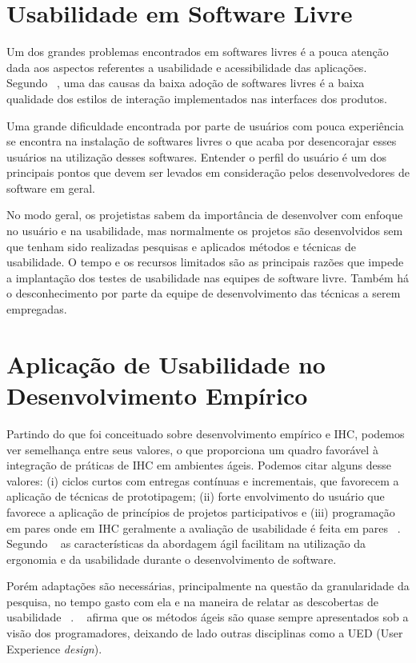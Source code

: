 \newpage

\section{Usabilidade em Software Livre}

Um dos grandes problemas encontrados em softwares livres é a pouca atenção dada aos aspectos referentes a usabilidade e acessibilidade das aplicações. 
%
Segundo ~, uma das causas da baixa adoção de softwares livres é a baixa qualidade dos estilos de interação implementados nas interfaces dos produtos. 

Uma grande dificuldade encontrada por parte de usuários com pouca experiência se encontra na instalação de softwares livres o que acaba por desencorajar esses usuários na utilização desses softwares. Entender o perfil do usuário é um dos principais pontos que devem ser levados em consideração pelos desenvolvedores de software em geral. 

No modo geral, os projetistas sabem da importância de desenvolver com enfoque no usuário e na usabilidade, mas normalmente os projetos são desenvolvidos sem que tenham sido realizadas pesquisas e aplicados métodos e técnicas de usabilidade.
%	
O tempo e os recursos limitados são as principais razões que impede a implantação dos testes de usabilidade nas equipes de software livre. Também há o desconhecimento por parte da equipe de desenvolvimento das técnicas a serem empregadas.
%
\section{Aplicação de Usabilidade no Desenvolvimento Empírico}

	Partindo do que foi conceituado sobre desenvolvimento empírico e IHC, podemos ver semelhança entre seus valores, o que proporciona um quadro favorável à integração de práticas de IHC em ambientes ágeis. Podemos citar alguns desse valores: (i) ciclos curtos com entregas contínuas e incrementais, que favorecem a aplicação de técnicas de prototipagem; (ii) forte envolvimento do usuário que favorece a aplicação de princípios de projetos participativos e (iii) programação em pares onde em IHC geralmente a avaliação de usabilidade é feita em pares ~\cite{barbosa2008estrategia}. 
	Segundo ~ as características da abordagem ágil facilitam na utilização da ergonomia e da usabilidade durante o desenvolvimento de software.
		
	Porém adaptações são necessárias, principalmente na questão da granularidade da pesquisa, no tempo gasto com ela e na maneira de relatar as descobertas de usabilidade ~\cite{santos2012}.
	~ afirma que os métodos ágeis são quase sempre apresentados sob a visão dos programadores, deixando de lado outras disciplinas como a UED (User Experience \emph{design}). 

